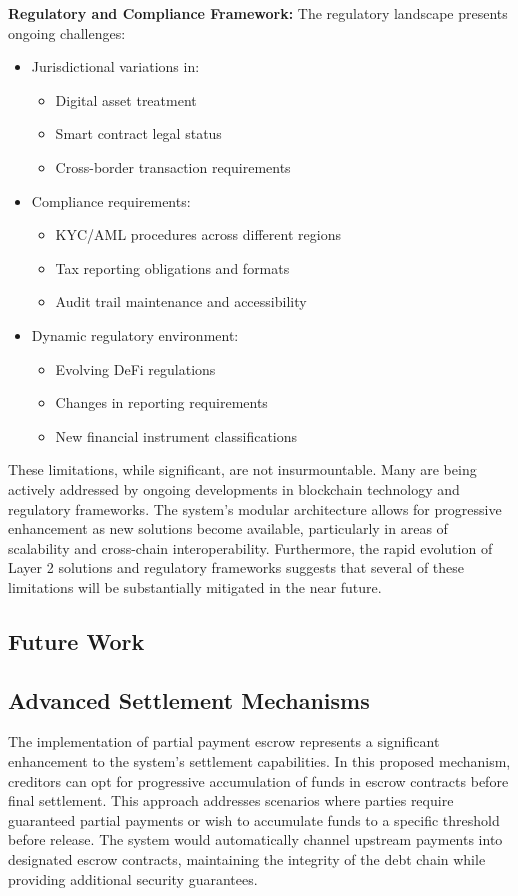 \documentclass[twocolumn,10pt,a4paper]{article}
\begin{document}
\textbf{Regulatory and Compliance Framework:}
The regulatory landscape presents ongoing challenges:
\begin{itemize}
    \item Jurisdictional variations in:
        \begin{itemize}
            \item Digital asset treatment
            \item Smart contract legal status
            \item Cross-border transaction requirements
        \end{itemize}
    \item Compliance requirements:
        \begin{itemize}
            \item KYC/AML procedures across different regions
            \item Tax reporting obligations and formats
            \item Audit trail maintenance and accessibility
        \end{itemize}
    \item Dynamic regulatory environment:
        \begin{itemize}
            \item Evolving DeFi regulations
            \item Changes in reporting requirements
            \item New financial instrument classifications
        \end{itemize}
\end{itemize}

These limitations, while significant, are not insurmountable. Many are being actively addressed by ongoing developments in blockchain technology and regulatory frameworks. The system's modular architecture allows for progressive enhancement as new solutions become available, particularly in areas of scalability and cross-chain interoperability. Furthermore, the rapid evolution of Layer 2 solutions and regulatory frameworks suggests that several of these limitations will be substantially mitigated in the near future.

\subsection{Future Work}
\subsection{Advanced Settlement Mechanisms}
The implementation of partial payment escrow represents a significant enhancement to the system's settlement capabilities. In this proposed mechanism, creditors can opt for progressive accumulation of funds in escrow contracts before final settlement. This approach addresses scenarios where parties require guaranteed partial payments or wish to accumulate funds to a specific threshold before release. The system would automatically channel upstream payments into designated escrow contracts, maintaining the integrity of the debt chain while providing additional security guarantees.
\end{document}
